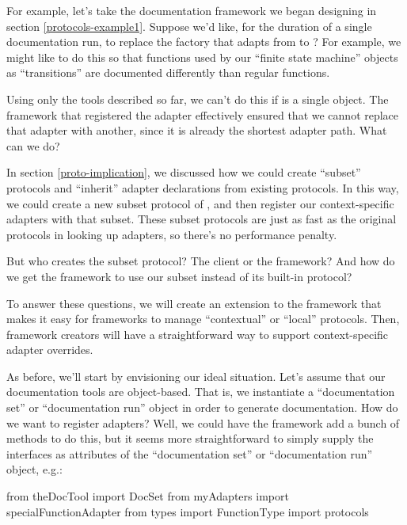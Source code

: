 \begin{verbatim%
}
\begin{verbatim%
}
\begin{verbatim%
}
\begin{verbatim%
}
\begin{verbatim%
}
\begin{verbatim%
}
For example, let's take the documentation framework we began designing in
section \ref{protocols-example1}.  Suppose we'd like, for the duration of a
single documentation run, to replace the factory that adapts from
 to ?  For example, we might like to
do this so that functions used by our ``finite state machine'' objects as
``transitions'' are documented differently than regular functions.

Using only the tools described so far, we can't do this if
 is a single object.  The framework that registered the
 adapter effectively ensured that we cannot
replace that adapter with another, since it is already the shortest adapter
path.  What can we do?

In section \ref{proto-implication}, we discussed how we could create ``subset''
protocols and ``inherit'' adapter declarations from existing protocols.  In
this way, we could create a new subset protocol of , and
then register our context-specific adapters with that subset.  These subset
protocols are just as fast as the original protocols in looking up adapters, so
there's no performance penalty.

But who creates the subset protocol?  The client or the framework?  And how do
we get the framework to use our subset instead of its built-in
 protocol?

To answer these questions, we will create an extension to the
 framework that makes it easy for frameworks to manage
``contextual'' or ``local'' protocols.  Then, framework creators will have a
straightforward way to support context-specific adapter overrides.




As before, we'll start by envisioning our ideal situation.  Let's assume that
our documentation tools are object-based.  That is, we instantiate a
``documentation set'' or ``documentation run'' object in order to generate
documentation.  How do we want to register adapters?  Well, we could have the
framework add a bunch of methods to do this, but it seems more straightforward
to simply supply the interfaces as attributes of the ``documentation set'' or
``documentation run'' object, e.g.:

\begin{verbatim%
}from theDocTool import DocSet
from myAdapters import specialFunctionAdapter
from types import FunctionType
import protocols


\end{verbatim%
}
\end{verbatim%
}
\end{verbatim%
}
\end{verbatim%
}
\end{verbatim%
}
\end{verbatim%
}
\end{verbatim%
}
